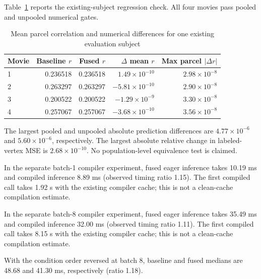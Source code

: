 Table~\ref{tab:fidelity} reports the existing-subject regression check. All four movies pass pooled and unpooled numerical gates.

\begin{table}[htbp]\centering\sffamily\small
\caption{Mean parcel correlation and numerical differences for one existing evaluation subject}\label{tab:fidelity}
\begin{tabular}{@{}lrrrr@{}}\toprule
Movie & Baseline $r$ & Fused $r$ & $\Delta$ mean $r$ & Max parcel $|\Delta r|$ \\\midrule
1 & 0.236518 & 0.236518 & $1.49\times10^{-10}$ & $2.98\times10^{-8}$ \\
2 & 0.263297 & 0.263297 & $-5.81\times10^{-10}$ & $2.90\times10^{-8}$ \\
3 & 0.200522 & 0.200522 & $-1.29\times10^{-9}$ & $3.30\times10^{-8}$ \\
4 & 0.257067 & 0.257067 & $-3.68\times10^{-10}$ & $3.56\times10^{-8}$ \\
\bottomrule\end{tabular}\end{table}

The largest pooled and unpooled absolute prediction differences are $4.77\times10^{-6}$ and $5.60\times10^{-6}$, respectively. The largest absolute relative change in labeled-vertex MSE is $2.68\times10^{-10}$. No population-level equivalence test is claimed.

In the separate batch-1 compiler experiment, fused eager inference takes 10.19 ms and compiled inference 8.89 ms (observed timing ratio 1.15). The first compiled call takes 1.92 s with the existing compiler cache; this is not a clean-cache compilation estimate.

In the separate batch-8 compiler experiment, fused eager inference takes 35.49 ms and compiled inference 32.00 ms (observed timing ratio 1.11). The first compiled call takes 8.15 s with the existing compiler cache; this is not a clean-cache compilation estimate.

With the condition order reversed at batch 8, baseline and fused medians are 48.68 and 41.30 ms, respectively (ratio 1.18).
